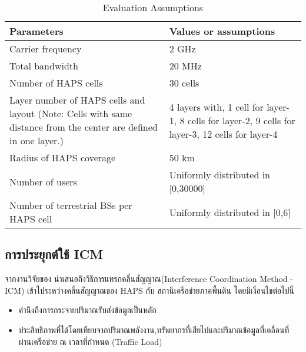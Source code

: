\begin{table}[h]
\centering
\begin{tabular}[h]{| l | l |}
\hline
Parameters                      & Values or assumptions \\
\hline
Carrier frequency               & 2 GHz \\
\hline
Total bandwidth                 & 20 MHz \\
\hline
Number of HAPS cells            & 30 cells \\
\hline
\parbox[t]{12em}{Layer number of HAPS cells and layout (Note: Cells with same distance from the center are defined in one layer.)}        & \parbox[t]{12em}{4 layers with, 1 cell for layer-1, 8 cells for layer-2, 9 cells for layer-3, 12 cells for layer-4} \\
\hline
Radius of HAPS coverage         & 50 km \\
\hline
Number of users                 & Uniformly distributed in [0,30000] \\
\hline
Number of terrestrial BSs per HAPS cell & Uniformly distributed in [0,6]\\
\hline
\end{tabular}
\caption{Evaluation Assumptions} \label{table:04-haps-evaluation}
\end{table}

\subsection{การประยุกต์ใช้ ICM}

จากงานวิจัยของ \cite[Interference Coordination Method for Integrated HAPS-Terrestrial Networks]{liu2021interference}
นำเสนอถึงวิธีการแทรกคลื่นสัญญาณ(Interference Coordination Method - ICM) เข้าไประหว่างคลื่นสัญญาณของ HAPS กับ สถานีเครือข่ายภาคพื้นดิน โดยมีเงื่อนไขต่อไปนี้
\begin{itemize}
    \item คำนึงถึงการกระจายปริมาณรับส่งข้อมูลเป็นหลัก 
    \item ประสิทธิภาพที่ได้โดยเทียบจากปริมาณพลังงาน,ทรัพยากรที่เสียไปและปริมาณข้อมูลที่เคลื่อนที่ผ่านเครือข่าย ณ เวลาที่กำหนด (Traffic Load)
\end{itemize}

